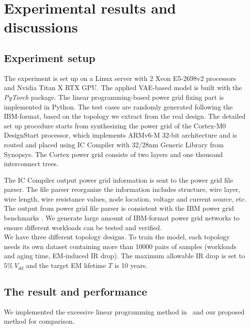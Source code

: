\section{Experimental results and discussions}
\label{sec:results}
\subsection{Experiment setup}
The experiment is set up on a Linux server with 2 Xeon E5-2698v2
processors and Nvidia Titan X RTX GPU. The applied VAE-based model is built with the {\it PyTorch} package. The linear
programming-based power grid fixing part is implemented in Python. The
test cases are randomly generated following the IBM-format, based on
the topology we extract from the real design. The detailed set up procedure
starts from synthesizing the power grid of the Cortex-M0 DesignStart 
processor, which implements ARMv6-M 32-bit architecture and is routed and placed
using IC Compiler with 32/28nm Generic Library from Synopsys. The Cortex power grid
consists of two layers and one thousand interconnect trees.

The IC Compiler output power grid information is sent to the power grid file parser.
The file parser reorganize the information includes structure, wire layer, wire length, 
wire resistance values, node location, voltage and current source, etc. The output from power grid
file parser is consistent with the IBM power grid benchmarks \cite{Nassif:ASPDAC'08}. We generate 
large amount of IBM-format power grid networks to ensure different workloads can be tested and verified.\\

We have three different topology designs. To train the model, each topology needs its own dataset containing more than 10000 pairs of samples  (workloads and aging time, EM-induced IR drop). The maximum allowable IR drop is set to $5\% \ V_{dd}$ and the target EM lifetime $T$ is 10 years. 







\subsection{The result and performance}
We implemented the excessive linear programming method in~\cite{Sukharev:2019pg} and our proposed method for comparison. 

